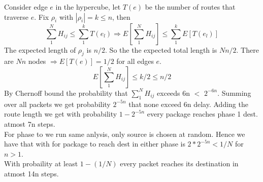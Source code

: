 \documentclass[a4paper]{article}
\begin{document}
Consider edge \(e\) in the hypercube, let \(T(e)\) be the number of routes that traverse \(e\). Fix \(\rho_i\) with \(|\rho_i| = k \leq n\), then
\[\sum_1^N H_{ij} \leq \sum_1^k T(e_l) \Rightarrow E[\sum_1^N H_{ij}] \leq \sum_1^k E[T(e_l)]\]
The expected length of \(\rho_j\) is \(n/2\). So the the expected total length is \(Nn/2\). There are \(Nn\) nodes \(\Rightarrow E[T(e)]= 1/2\) for all edges \(e\).
\[E[\sum_1^N H_{ij}] \leq k/2 \leq n/2\]
By Chernoff bound the probability that \(\sum_1^N H_{ij}\) exceeds 6n \(<\) \(2^{-6n}\). Summing over all packets we get probability \(2^{-5n}\) that none exceed 6n delay. Adding the route length we get with probability \(1-2^{-5n}\) every package reaches phase 1 dest. atmost 7n steps.\\
For phase to we run same anlysis, only source is chosen at random. Hence we have that with for package to reach dest in either phase is \(2*2^{-5n} < 1/N\) for \(n>1\).\\
With probaility at least \(1-(1/N)\) every packet reaches its destination in atmost 14n steps. 
\end{document}
